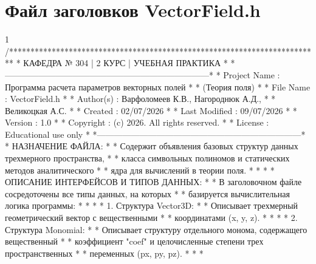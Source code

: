 \section{Файл заголовков VectorField.h}
\footnotesize
\begin{listing}{1}
/*************************************************************************
* КАФЕДРА № 304 | 2 КУРС | УЧЕБНАЯ ПРАКТИКА                             *
*------------------------------------------------------------------------*
* Project Name  : Программа расчета параметров векторных полей           *
* (Теория поля)                                                          *
* File Name     : VectorField.h                                          *
* Author(s)     : Варфоломеев К.В., Нагороднюк А.Д.,                     *
*                 Великоцкая А.С.                                        *
* Created       : 02/07/2026                                             *
* Last Modified : 09/07/2026                                             *
* Version       : 1.0                                                    *
* Copyright     : (c) 2026. All rights reserved.                         *
* License       : Educational use only                                   *
*------------------------------------------------------------------------*
* НАЗНАЧЕНИЕ ФАЙЛА:                                                      *
* Содержит объявления базовых структур данных трехмерного пространства,  *
* класса символьных полиномов и статических методов аналитического       *
* ядра для вычислений в теории поля.                                     *
*                                                                        *
* ОПИСАНИЕ ИНТЕРФЕЙСОВ И ТИПОВ ДАННЫХ:                                   *
* В заголовочном файле сосредоточены все типы данных, на которых         *
* базируется вычислительная логика программы:                            *
*                                                                        *
* 1. Структура Vector3D:                                                 *
* Описывает трехмерный геометрический вектор с вещественными             *
* координатами (x, y, z).                                                *
*                                                                        *
* 2. Структура Monomial:                                                 *
* Описывает структуру отдельного монома, содержащего вещественный        *
* коэффициент "coef" и целочисленные степени трех пространственных       *
* переменных (px, py, pz).                                               *
*                                                                        *

\end{listing}
